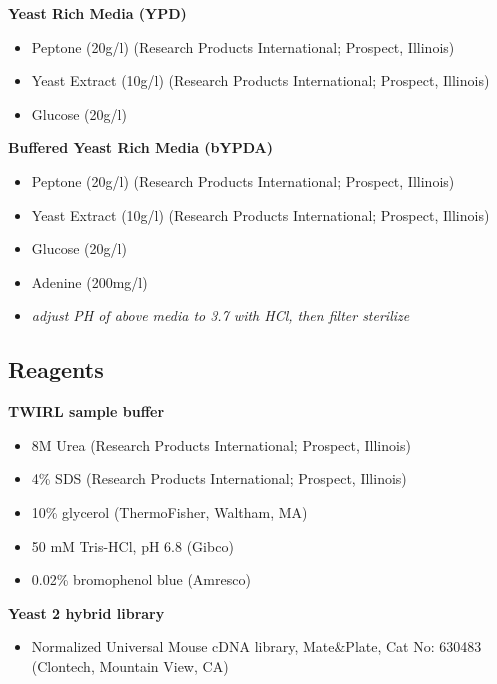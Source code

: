 \documentclass[11pt,fleqn]{book} %
\begin{document}
\textbf{Yeast Rich Media (YPD)}

\begin{itemize}
    \item Peptone (20g/l) (Research Products International; Prospect, Illinois)
    \item Yeast Extract (10g/l) (Research Products International; Prospect, Illinois)
    \item Glucose (20g/l)
\end{itemize}

\textbf{Buffered Yeast Rich Media (bYPDA)}

\begin{itemize}
    \item Peptone (20g/l) (Research Products International; Prospect, Illinois)
    \item Yeast Extract (10g/l) (Research Products International; Prospect, Illinois)
    \item Glucose (20g/l)
    \item Adenine (200mg/l)
    \item \emph{adjust PH of above media to 3.7 with HCl, then filter sterilize}
\end{itemize}

\subsection{Reagents}

\textbf{TWIRL sample buffer}

\begin{itemize}
    \item 8M Urea (Research Products International; Prospect, Illinois)
    \item 4\% SDS (Research Products International; Prospect, Illinois)
    \item 10\% glycerol (ThermoFisher, Waltham, MA)
    \item 50 mM Tris-HCl, pH 6.8 (Gibco)
    \item 0.02\% bromophenol blue (Amresco)
\end{itemize}

\textbf{Yeast 2 hybrid library}

\begin{itemize}
    \item Normalized Universal Mouse cDNA library, Mate\&Plate, Cat No: 630483 (Clontech, Mountain View, CA)
\end{itemize}
\end{document}
